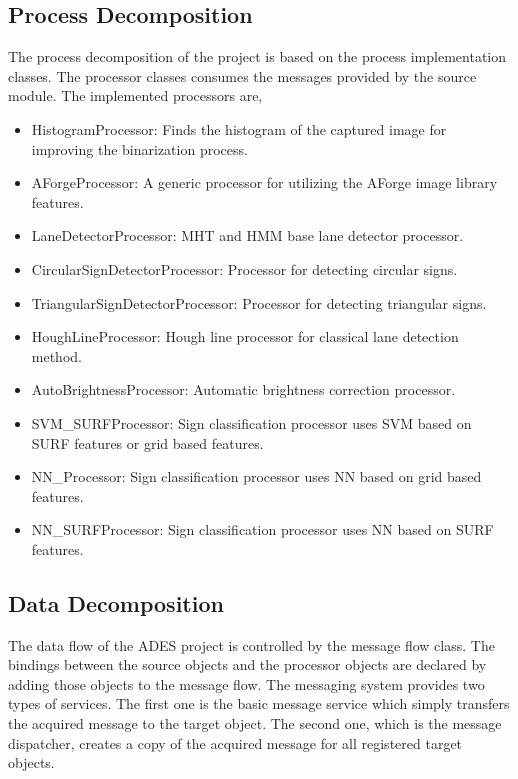 \documentclass[a4paper,oneside,12pt]{report}
\begin{document}
\subsection{Process Decomposition}
The process decomposition of the project is based on the process implementation classes. The processor classes consumes the messages provided by the source module. The implemented processors are,
\begin{itemize}
	\item HistogramProcessor: Finds the histogram of the captured image for improving the binarization process.
	\item AForgeProcessor: A generic processor for utilizing the AForge image library features.
	\item LaneDetectorProcessor: MHT and HMM base lane detector processor.
	\item CircularSignDetectorProcessor: Processor for detecting circular signs.
	\item TriangularSignDetectorProcessor: Processor for detecting triangular signs.
	\item HoughLineProcessor: Hough line processor for classical lane detection method.
	\item AutoBrightnessProcessor: Automatic brightness correction processor.
	\item SVM\_SURFProcessor: Sign classification processor uses SVM based on SURF features or grid based features.
	\item NN\_Processor: Sign classification processor uses NN based on grid based features.
	\item NN\_SURFProcessor: Sign classification processor uses NN based on SURF features.
\end{itemize}

\subsection{Data Decomposition}
The data flow of the ADES project is controlled by the message flow class. The bindings between the source objects and the processor objects are declared by adding those objects to the message flow. The messaging system provides two types of services. The first one is the basic message service which simply transfers the acquired message to the target object. The second one, which is the message dispatcher, creates a copy of the acquired message for all registered target objects.
\end{document}
